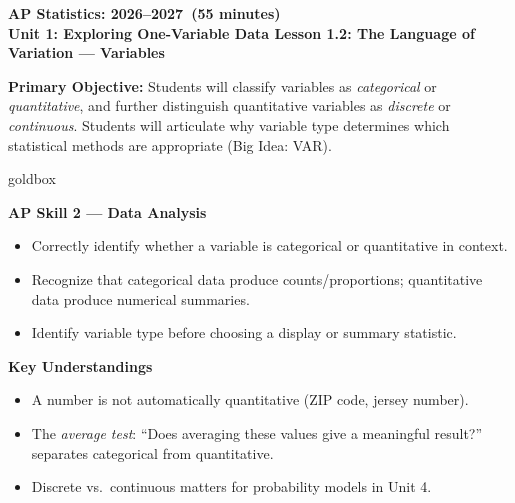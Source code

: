 \documentclass[10pt]{article}
\begin{document}
\def\CourseName{AP Statistics}
\def\SchoolYear{2026--2027}
\def\MeetingLength{55 minutes}
\def\UnitNumberName{Unit 1: Exploring One-Variable Data \quad}
\def\LessonNumberName{Lesson 1.2: The Language of Variation --- Variables}

\begin{center}
    {\Large\bfseries \CourseName: \SchoolYear\ (\MeetingLength) \\[4pt]
    {\small\bfseries \UnitNumberName \LessonNumberName}}
\end{center}

\begin{tcolorbox}[colback=sky,colframe=navy,boxrule=0.9pt,arc=2mm,
    left=2mm,right=2mm,top=1.5mm,bottom=1.5mm]
    \textbf{Primary Objective:} Students will classify variables as \textit{categorical} or
    \textit{quantitative}, and further distinguish quantitative variables as \textit{discrete} or
    \textit{continuous}. Students will articulate why variable type determines which statistical
    methods are appropriate (Big Idea: VAR).
\end{tcolorbox}

\vspace{4pt}

\begin{skillbox}{goldbox}
\begin{minipage}[t]{0.48\linewidth}
    \textbf{AP Skill 2 --- Data Analysis}
    \begin{itemize}
        \item Correctly identify whether a variable is categorical or quantitative in context.
        \item Recognize that categorical data produce counts/proportions; quantitative data
              produce numerical summaries.
        \item Identify variable type before choosing a display or summary statistic.
    \end{itemize}
\end{minipage}
\hfill
\begin{minipage}[t]{0.48\linewidth}
    \textbf{Key Understandings}
    \begin{itemize}
        \item A number is not automatically quantitative (ZIP code, jersey number).
        \item The \textit{average test}: ``Does averaging these values give a meaningful
              result?'' separates categorical from quantitative.
        \item Discrete vs.\ continuous matters for probability models in Unit 4.
    \end{itemize}
\end{minipage}
\end{skillbox}
\end{document}
